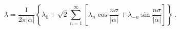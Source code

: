 \begin{equation}
\lambda = \frac{1}{2 \pi |\alpha|} \left\{ \lambda_{0} + \sqrt{2} 
\sum_{n=1}^{\infty} 
\left[ \lambda_{n} \cos \frac{n \sigma}{|\alpha|} +
\lambda_{-n} \sin \frac{n \sigma}{|\alpha|} \right] \right\}
\label{svexpa8}~.
\end{equation}

